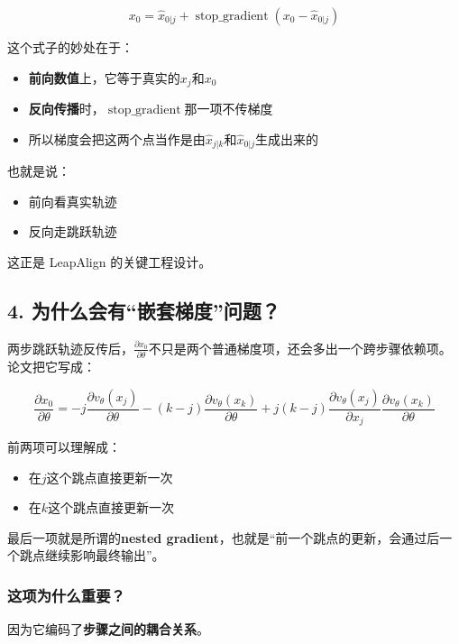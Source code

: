 \[
x_0
=
\hat{x}_{0|j}
+
\operatorname{stop\_gradient}(x_0 - \hat{x}_{0|j})
\]

这个式子的妙处在于：

\begin{itemize}[leftmargin=1.5em]
  \item \textbf{前向数值}上，它等于真实的$x_j$和$x_0$
  \item \textbf{反向传播}时，$\operatorname{stop\_gradient}$那一项不传梯度
  \item 所以梯度会把这两个点当作是由$\hat{x}_{j|k}$和$\hat{x}_{0|j}$生成出来的
\end{itemize}

也就是说：

\begin{itemize}[leftmargin=1.5em]
  \item 前向看真实轨迹
  \item 反向走跳跃轨迹
\end{itemize}

这正是 LeapAlign 的关键工程设计。

\subsection{4. 为什么会有“嵌套梯度”问题？}

两步跳跃轨迹反传后，$\frac{\partial x_0}{\partial \theta}$不只是两个普通梯度项，还会多出一个跨步骤依赖项。论文把它写成：

\[
\frac{\partial x_0}{\partial \theta}
=
- j \frac{\partial v_\theta(x_j)}{\partial \theta}
- (k-j) \frac{\partial v_\theta(x_k)}{\partial \theta}
+ j(k-j)
\frac{\partial v_\theta(x_j)}{\partial x_j}
\frac{\partial v_\theta(x_k)}{\partial \theta}
\]

前两项可以理解成：

\begin{itemize}[leftmargin=1.5em]
  \item 在$j$这个跳点直接更新一次
  \item 在$k$这个跳点直接更新一次
\end{itemize}

最后一项就是所谓的\textbf{nested gradient}，也就是“前一个跳点的更新，会通过后一个跳点继续影响最终输出”。

\subsubsection{这项为什么重要？}

因为它编码了\textbf{步骤之间的耦合关系}。

